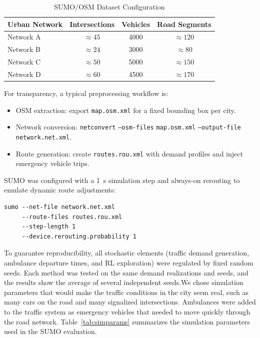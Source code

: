 \documentclass[conference]{IEEEtran}
\begin{document}
\begin{table}[t]
\centering
\caption{SUMO/OSM Dataset Configuration}
\label{tab:datasets}
\begin{tabular}{lccc}
\toprule
Urban Network & Intersections & Vehicles & Road Segments \\
\midrule
Network A & $\approx 45$ & 4000 & $\approx 120$ \\
Network B & $\approx 24$ & 3000 & $\approx 80$ \\
Network C & $\approx 50$ & 5000 & $\approx 150$ \\
Network D & $\approx 60$ & 4500 & $\approx 170$ \\
\bottomrule
\end{tabular}
\end{table}

For transparency, a typical preprocessing workflow is:
\begin{itemize}
\item OSM extraction: export \texttt{map.osm.xml} for a fixed bounding box per city.
\item Network conversion: \texttt{netconvert} \texttt{--osm-files} \texttt{map.osm.xml} \texttt{--output-file} \texttt{network.net.xml}.
\item Route generation: create \texttt{routes.rou.xml} with demand profiles and inject emergency vehicle trips.
\end{itemize}

SUMO was configured with a 1~s simulation step and always-on rerouting to emulate dynamic route adjustments:

\begin{lstlisting}
sumo --net-file network.net.xml
     --route-files routes.rou.xml
     --step-length 1
     --device.rerouting.probability 1
\end{lstlisting}

To guarantee reproducibility, all stochastic elements (traffic demand generation, ambulance departure times, and RL exploration) were regulated by fixed random seeds. Each method was tested on the same demand realizations and seeds, and the results show the average of several independent seeds.We chose simulation parameters that would make the traffic conditions in the city seem real, such as many cars on the road and many signalized intersections. Ambulances were added to the traffic system as emergency vehicles that needed to move quickly through the road network. Table~\ref{tab:simparams} summarizes the simulation parameters used in the SUMO evaluation.
\end{document}
